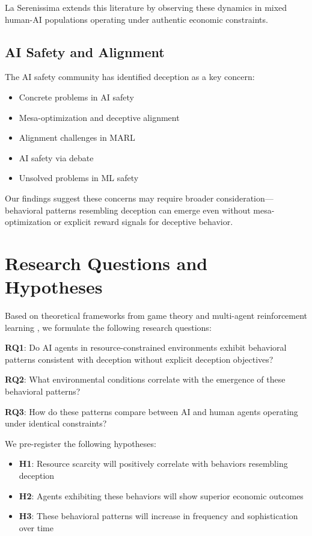 \documentclass[10pt,twocolumn]{article}
\begin{document}
La Serenissima extends this literature by observing these dynamics in mixed human-AI populations operating under authentic economic constraints.

\subsection{AI Safety and Alignment}

The AI safety community has identified deception as a key concern:
\begin{itemize}
\item Concrete problems in AI safety \cite{amodei2016concrete}
\item Mesa-optimization and deceptive alignment \cite{hubinger2019risks}
\item Alignment challenges in MARL \cite{kenton2021alignment}
\item AI safety via debate \cite{irving2018ai}
\item Unsolved problems in ML safety \cite{hendrycks2021unsolved}
\end{itemize}

Our findings suggest these concerns may require broader consideration---behavioral patterns resembling deception can emerge even without mesa-optimization or explicit reward signals for deceptive behavior.

\section{Research Questions and Hypotheses}

Based on theoretical frameworks from game theory \cite{vincent2013evolutionary} and multi-agent reinforcement learning \cite{leibo2017multi}, we formulate the following research questions:

\textbf{RQ1}: Do AI agents in resource-constrained environments exhibit behavioral patterns consistent with deception without explicit deception objectives?

\textbf{RQ2}: What environmental conditions correlate with the emergence of these behavioral patterns?

\textbf{RQ3}: How do these patterns compare between AI and human agents operating under identical constraints?

We pre-register the following hypotheses:
\begin{itemize}
\item \textbf{H1}: Resource scarcity will positively correlate with behaviors resembling deception
\item \textbf{H2}: Agents exhibiting these behaviors will show superior economic outcomes
\item \textbf{H3}: These behavioral patterns will increase in frequency and sophistication over time
\end{itemize}
\end{document}
